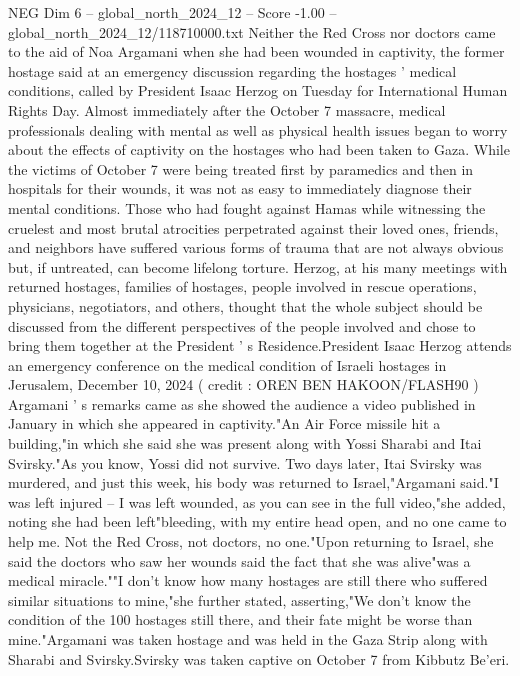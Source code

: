 \begin{textsample}{NEG Dim 6 – global\_north\_2024\_12 – Score -1.00 – global\_north\_2024\_12/118710000.txt}  \label{ex:f6_neg_192}
Neither the Red Cross nor doctors came to the aid of Noa Argamani when she had been wounded in captivity, the former hostage said at an emergency discussion regarding the hostages ' medical conditions, called by President Isaac Herzog on Tuesday for International Human Rights Day.
Almost immediately after the October 7 massacre, medical professionals dealing with mental as well as physical health issues began to worry about the effects of captivity on the hostages who had been taken to Gaza.
While the victims of October 7 were being treated first by paramedics and then in hospitals for their wounds, it was not as easy to immediately diagnose their mental conditions.
Those who had fought against Hamas while witnessing the cruelest and most brutal atrocities perpetrated against their loved ones, friends, and neighbors have suffered various forms of trauma that are not always obvious but, if untreated, can become lifelong torture.
Herzog, at his many meetings with returned hostages, families of hostages, people involved in rescue operations, physicians, negotiators, and others, thought that the whole subject should be discussed from the different perspectives of the people involved and chose to bring them together at the President ' s Residence.President Isaac Herzog attends an emergency conference on the medical condition of Israeli hostages in Jerusalem, December 10, 2024 ( credit : OREN BEN HAKOON/FLASH90 ) Argamani ' s remarks came as she showed the audience a video published in January in which she appeared in captivity."An Air Force missile hit a building,"in which she said she was present along with Yossi Sharabi and Itai Svirsky."As you know, Yossi did not survive.
Two days later, Itai Svirsky was murdered, and just this week, his body was returned to Israel,"Argamani said."I was left injured -- I was left wounded, as you can see in the full video,"she added, noting she had been left"bleeding, with my entire head open, and no one came to help me.
Not the Red Cross, not doctors, no one."Upon returning to Israel, she said the doctors who saw her wounds said the fact that she was alive"was a medical miracle.""I don't know how many hostages are still there who suffered similar situations to mine,"she further stated, asserting,"We don't know the condition of the 100 hostages still there, and their fate might be worse than mine."Argamani was taken hostage and was held in the Gaza Strip along with Sharabi and Svirsky.Svirsky was taken captive on October 7 from Kibbutz Be'eri.

\end{textsample}
